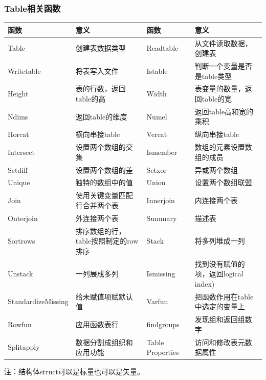         \subsubsection{Table相关函数}
            \begin{table}[H]
            \centering
                \begin{tabularx}{\textwidth}{lXlX}%
                \toprule
                函数 & 意义&函数 & 意义\\
                \midrule
            Table   & 创建表数据类型&Readtable &从文件读取数据，创建表  \\
            Writetable  &将表写入文件&Istable &判断一个变量是否是table类型\\
            Height  &表的行数，返回table的高 & Width & 表变量的数量，返回table的宽\\
            Ndims   &返回table的维度&Numel  &返回table高和宽的乘积\\
            Horcat  &横向串接table&Vercat &纵向串接table\\
            Intersect &设置两个数组的交集&Ismember &数组的元素设置数组的成员\\
            Setdiff &设置两个数组的差&Setxor  &异或两个数组\\
            Unique  &独特的数组中的值&Union &设置两个数组联盟\\
            Join  &使用关键变量匹配行合并两个表&Innerjoin &内连接两个表\\
            Outerjoin &外连接两个表&Summary &描述表\\
            Sortrows  &排序数组的行，table按照制定的row排序&Stack &将多列堆成一列\\
            Unstack &一列展成多列 & Ismissing &找到没有赋值的项，返回logical index)\\
            StandardizeMissing  &给未赋值项赋默认值&Varfun &把函数作用在table中选定的变量上\\
            Rowfun  &应用函数表行& findgroups &发现组和返回组数字\\
            Splitapply  &数据分割成组织和应用功能&Table Properties  &访问和修改表元数据属性\\
                \bottomrule
            \end{tabularx}
            \end{table}
            \noindent 注：结构体struct可以是标量也可以是矢量。
